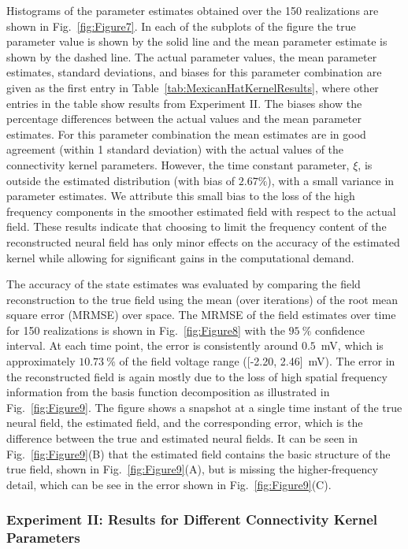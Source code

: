 \documentclass[5p,authoryear]{elsarticle}
\begin{document}
Histograms of the parameter estimates obtained over the 150 realizations are shown in Fig.~\ref{fig:Figure7}. In each of the subplots of the figure the true parameter value is shown by the solid line and the mean parameter estimate is shown by the dashed line. The actual parameter values, the mean parameter estimates, standard deviations, and biases for this parameter combination are given as the first entry in Table~\ref{tab:MexicanHatKernelResults}, where other entries in the table show results from Experiment II. The biases show the percentage differences between the actual values and the mean parameter estimates. For this parameter combination the mean estimates are in good agreement (within 1 standard deviation) with the actual values of the connectivity kernel parameters. However, the time constant parameter, $\xi$, is outside the estimated distribution (with bias of $2.67\%$), with a small variance in parameter estimates. We attribute this small bias to the loss of the high frequency components in the smoother estimated field with respect to the actual field. These results indicate that choosing to limit the frequency content of the reconstructed neural field has only minor effects on the accuracy of the estimated kernel while allowing for significant gains in the computational demand.

The accuracy of the state estimates was evaluated by comparing the field reconstruction to the true field using the mean (over iterations) of the root mean square error (MRMSE) over space. The MRMSE of the field estimates over time for 150 realizations is shown in Fig.~\ref{fig:Figure8} with the $95~\%$ confidence interval. At each time point, the error is consistently around $0.5$~mV, which is approximately $10.73~\%$ of the field voltage range ([-2.20, 2.46]~mV). The error in the reconstructed field is again mostly due to the loss of high spatial frequency information from the basis function decomposition as illustrated in Fig.~\ref{fig:Figure9}. The figure shows a snapshot at a single time instant of the true neural field, the estimated field, and the corresponding error, which is the difference between the true and estimated neural fields. It can be seen in Fig.~\ref{fig:Figure9}(B) that the estimated field contains the basic structure of the true field, shown in Fig.~\ref{fig:Figure9}(A), but is missing the higher-frequency detail, which can be see in the error shown in Fig.~\ref{fig:Figure9}(C).

\subsubsection{Experiment II: Results for Different Connectivity Kernel Parameters}
\end{document}
